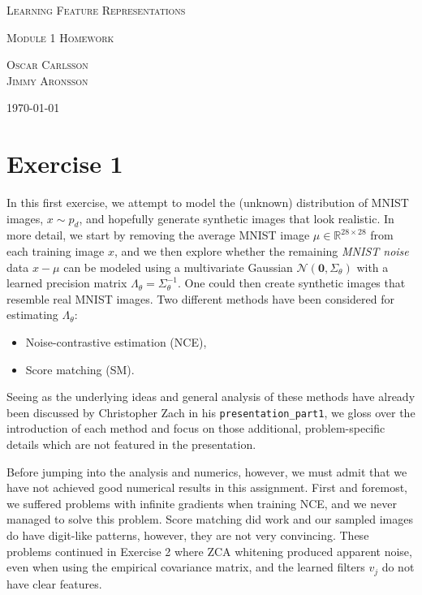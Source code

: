 \documentclass[a4paper]{article}
\theoremstyle{definition}
\theoremstyle{plain}
\begin{document}
{\center\Large\scshape Learning Feature Representations\par}
{\center\large\scshape Module 1 Homework\par}
\vspace{2mm}
{\center\scshape Oscar Carlsson\\Jimmy Aronsson\par}
\vspace{1mm}
{\center\small\scshape \today\par}
\vspace{7mm}


\section*{\center Exercise 1}

In this first exercise, we attempt to model the (unknown) distribution of MNIST images, $x \sim p_d$, and hopefully generate synthetic images that look realistic. In more detail, we start by removing the average MNIST image $\mu \in \mathbb{R}^{28\times 28}$ from each training image $x$, and we then explore whether the remaining \emph{MNIST noise} data $x - \mu$ can be modeled using a multivariate Gaussian $\mathcal{N}(\mathbf{0},\Sigma_\theta)$ with a learned precision matrix $\Lambda_\theta = \Sigma_\theta^{-1}$. One could then create synthetic images that resemble real MNIST images. Two different methods have been considered for estimating $\Lambda_\theta$:
\begin{itemize}
\item Noise-contrastive estimation (NCE),
\item Score matching (SM).
\end{itemize}
Seeing as the underlying ideas and general analysis of these methods have already been discussed by Christopher Zach in his \texttt{presentation\_part1}, we gloss over the introduction of each method and focus on those additional, problem-specific details which are not featured in the presentation. 

Before jumping into the analysis and numerics, however, we must admit that we have not achieved good numerical results in this assignment. First and foremost, we suffered problems with infinite gradients when training NCE, and we never managed to solve this problem. Score matching did work and our sampled images do have digit-like patterns, however, they are not very convincing. These problems continued in Exercise 2 where ZCA whitening produced apparent noise, even when using the empirical covariance matrix, and the learned filters $v_j$ do not have clear features.
\end{document}
